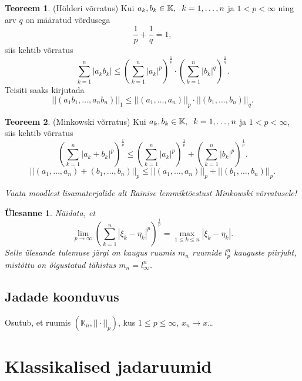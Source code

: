 \documentclass{article}[12pt]
\newcommand{\h}{\hspace{0.2cm}}
\newcommand{\K}{\mathbb{K}}
\newcommand{\norm}[1]{||#1||}
\newtheorem{yl}{Ülesanne}[section]
\theoremstyle{definition}
\theoremstyle{definition}
\newtheorem{theorem}{Teoreem}[section]
\theoremstyle{definition}
\begin{document}
\begin{theorem}
	(Hölderi võrratus) Kui $a_k,b_k\in \K,\h k=1,\dots,n$ ja $1<p<\infty$ ning arv $q$ on määratud võrdusega
	\[
		\frac{1}{p} + \frac{1}{q} = 1,
	\]
	siis kehtib võrratus
	\[
		\sum_{k=1}^n |a_k b_k| \leq \left( \sum_{k=1}^n |a_k|^p \right)^{\frac{1}{p}} \cdot \left( \sum_{k=1}^n |b_k|^q \right)^{\frac{1}{q}}.
	\]
	Teisiti saaks kirjutada
	\[
		\norm{(a_1b_1,\dots,a_nb_n)}_1 \leq \norm{(a_1,\dots,a_n)}_p \cdot \norm{(b_1,\dots,b_n)}_q.
	\]
\end{theorem}
\begin{theorem}
	(Minkowski võrratus) Kui $a_k,b_k\in \K,\h k=1,\dots,n$ ja $1<p<\infty$, siis kehtib võrratus
	\[
		\left( \sum_{k=1}^n |a_k + b_k|^p \right)^{\frac{1}{p}} \leq \left( \sum_{k=1}^n |a_k|^p \right)^{\frac{1}{p}} + \left( \sum_{k=1}^n |b_k|^p \right)^{\frac{1}{p}}.
	\]
	\[
		\norm{(a_1,\dots,a_n) + (b_1,\dots,b_n)}_p \leq \norm{(a_1,\dots,a_n)}_p + \norm{(b_1,\dots,b_n)}_p.
	\]
\end{theorem}

\textit{Vaata moodlest lisamaterjalide alt Rainise lemmiktõestust Minkowski võrratusele!}

\begin{yl}
	Näidata, et
	\[
		\lim_{p\rightarrow \infty} \left( \sum_{k=1}^n |\xi_k-\eta_k|^p \right)^{\frac{1}{p}} = \max_{1\leq k\leq n} |\xi_k - \eta_k|.
	\]
	Selle ülesande tulemuse järgi on kaugus ruumis $m_n$ ruumide $l_p^n$ kauguste piirjuht, mistõttu on õigustatud tähistus $m_n = l_\infty^n$.
\end{yl}

\subsection*{Jadade koonduvus}

Osutub, et ruumis $(\K_n, \norm{\cdot}_p)$, kus $1\leq p\leq \infty$, $x_n\rightarrow x$\dots

\section{Klassikalised jadaruumid}
\end{document}
